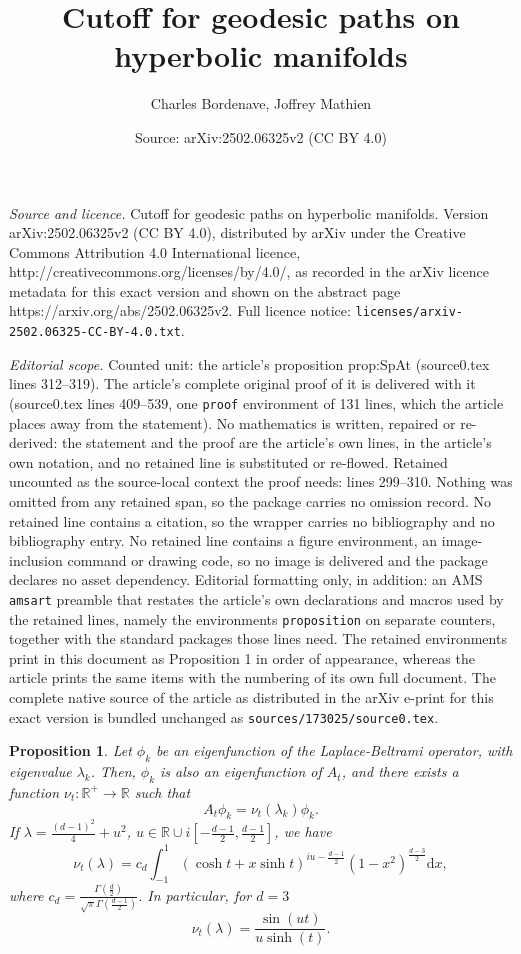 \documentclass[10pt,a4paper]{amsart}
\title{Cutoff for geodesic paths on hyperbolic manifolds}
\author{Charles Bordenave, Joffrey Mathien}
\date{Source: arXiv:2502.06325v2 (CC BY 4.0)}
\newtheorem{proposition}{Proposition}
\newcommand{\R}{\mathds{R}}
\newcommand{\Rp}{\R^{+}}
\renewcommand{\d}{\mathrm{d}}
\begin{document}
\maketitle

\noindent\emph{Source and licence.} Cutoff for geodesic paths on hyperbolic manifolds. Version arXiv:2502.06325v2 (CC BY 4.0), distributed by arXiv under the Creative Commons Attribution 4.0 International licence, http://creativecommons.org/licenses/by/4.0/, as recorded in the arXiv licence metadata for this exact version and shown on the abstract page https://arxiv.org/abs/2502.06325v2. Full licence notice: \texttt{licenses/arxiv-2502.06325-CC-BY-4.0.txt}.\par\smallskip

\noindent\textit{Editorial scope.} Counted unit: the article's proposition prop:SpAt (source0.tex lines 312--319). The article's complete original proof of it is delivered with it (source0.tex lines 409--539, one \texttt{proof} environment of 131 lines, which the article places away from the statement). No mathematics is written, repaired or re-derived: the statement and the proof are the article's own lines, in the article's own notation, and no retained line is substituted or re-flowed.  Retained uncounted as the source-local context the proof needs: lines 299--310.  Nothing was omitted from any retained span, so the package carries no omission record.  No retained line contains a citation, so the wrapper carries no bibliography and no bibliography entry.  No retained line contains a figure environment, an image-inclusion command or drawing code, so no image is delivered and the package declares no asset dependency.  Editorial formatting only, in addition: an AMS \texttt{amsart} preamble that restates the article's own declarations and macros used by the retained lines, namely the environments \texttt{proposition} on separate counters, together with the standard packages those lines need.  The retained environments print in this document as Proposition 1 in order of appearance, whereas the article prints the same items with the numbering of its own full document.  The complete native source of the article as distributed in the arXiv e-print for this exact version is bundled unchanged as \texttt{sources/173025/source0.tex}.
\begin{proposition}{}\label{prop:SpAt0}
	Let $\phi_k$ be an eigenfunction of the Laplace-Beltrami operator, with eigenvalue $\lambda_k$. Then, $\phi_k$ is also an eigenfunction of $A_t$, and there exists a function $\nu_t\colon \Rp \to \R$ such that \[A_t\phi_k = \nu_t(\lambda_k)\phi_k.\]
	If $\lambda = \frac{(d-1)^2}{4}+u^2$, $u \in \R \cup i \left[-\frac{d-1}{2}, \frac{d-1}{2}\right]$,
	we have 
$$
\nu_t(\lambda) =  c_d \int_{-1}^1 ( \cosh t  +  x \sinh t  )^{iu - \frac{d-1}{2}}  ( 1 - x^2)^{ \frac{d - 3}{2}} \d x,  
$$
where $c_d = \frac{\Gamma\left( \frac{d}{2}\right)}{\sqrt{\pi} \Gamma\left( \frac{d-1}{2}\right)}$. In particular, for $d=3$ 
$$
\nu_t(\lambda) = \frac{\sin (ut)}{u \sinh (t)}.
$$
\end{proposition}
\end{document}
